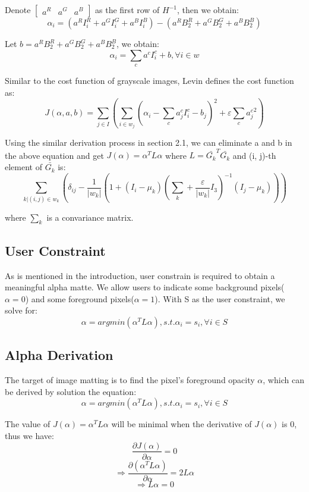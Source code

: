 \documentclass[11pt,letterpaper]{article}
\begin{document}
Denote $\begin{bmatrix} a^R & a^G & a^B \end{bmatrix}$ as the first row of $H^{-1}$, then we obtain: 
$$\alpha_i = 
(a^RI_i^R + a^GI_i^G + a^BI_i^B)-(a^RB_2^R + a^GB_2^G + a^BB_2^B)$$

Let $b = a^RB_2^R + a^GB_2^G + a^BB_2^B$, we obtain:
$$\alpha_i = \sum_{c}a^cI_i^c + b, \forall i \in w$$

Similar to the cost function of gray­scale images, Levin defines the cost function as:
$$J(\alpha, a, b) = \sum_{j \in I}(\sum_{i \in w_j}(\alpha_i - \sum_c a_j^c I_i^c-b_j)^2+\varepsilon \sum_{c}{a_j^c}^2)$$

Using the similar derivation process in section 2.1, we can eliminate a and b in the above equation and get $J(\alpha) = \alpha^T L \alpha$ where $L = \bar{G_k}^T \bar{G_k}$ and (i, j)-th element of $\bar{G_k}$ is:
$$\sum_{k|(i,j) \in w_k} (\delta_{ij} - \frac{1}{|w_k|}(1 + (I_i - \mu_k)(\sum_k + \frac{\varepsilon}{|w_k|}I_3)^{-1}(I_j - \mu_k)))$$

where $\sum_k$ is a convariance matrix.
\subsection{User Constraint}
As is mentioned in the introduction, user constrain is required to obtain a meaningful alpha matte. We allow users to indicate some background pixels($\alpha = 0$) and some foreground pixels($\alpha = 1$). With S as the user constraint, we solve for:
$$\alpha = argmin(\alpha^T L \alpha), s.t.\alpha_i = s_i, \forall i \in S $$

\subsection{Alpha Derivation}
The target of image matting is to find the pixel’s foreground opacity $\alpha$, which can be derived by solution the equation:
$$\alpha = argmin(\alpha^T L \alpha), s.t.\alpha_i = s_i, \forall i \in S $$

The value of $J(\alpha) = \alpha^T L \alpha$ will be minimal when the derivative of $J(\alpha)$ is 0, thus we have:
$$\frac{\partial J(\alpha)}{\partial \alpha} = 0$$
$$\Rightarrow \frac{\partial{(\alpha^T L \alpha)}}{\partial \alpha} = 2L\alpha$$
$$\Rightarrow L\alpha = 0$$
\end{document}
